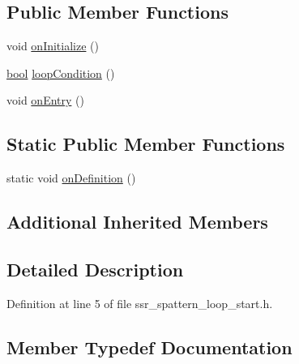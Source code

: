 \subsection*{Public Member Functions}
\begin{DoxyCompactItemize}
\item 
void \hyperlink{structsm__dance__bot_1_1s__pattern__states_1_1SsrSPatternLoopStart_a00c008cad49c551ffc9c2057053e6ef1}{on\+Initialize} ()
\item 
\hyperlink{classbool}{bool} \hyperlink{structsm__dance__bot_1_1s__pattern__states_1_1SsrSPatternLoopStart_a5b8adab95ab5cc8b4a4364a9553f27db}{loop\+Condition} ()
\item 
void \hyperlink{structsm__dance__bot_1_1s__pattern__states_1_1SsrSPatternLoopStart_a78a7bac39e69ca243ac4e24a34796732}{on\+Entry} ()
\end{DoxyCompactItemize}
\subsection*{Static Public Member Functions}
\begin{DoxyCompactItemize}
\item 
static void \hyperlink{structsm__dance__bot_1_1s__pattern__states_1_1SsrSPatternLoopStart_a85c738cf2b0fea3e6dba41ae728990d1}{on\+Definition} ()
\end{DoxyCompactItemize}
\subsection*{Additional Inherited Members}


\subsection{Detailed Description}


Definition at line 5 of file ssr\+\_\+spattern\+\_\+loop\+\_\+start.\+h.



\subsection{Member Typedef Documentation}
